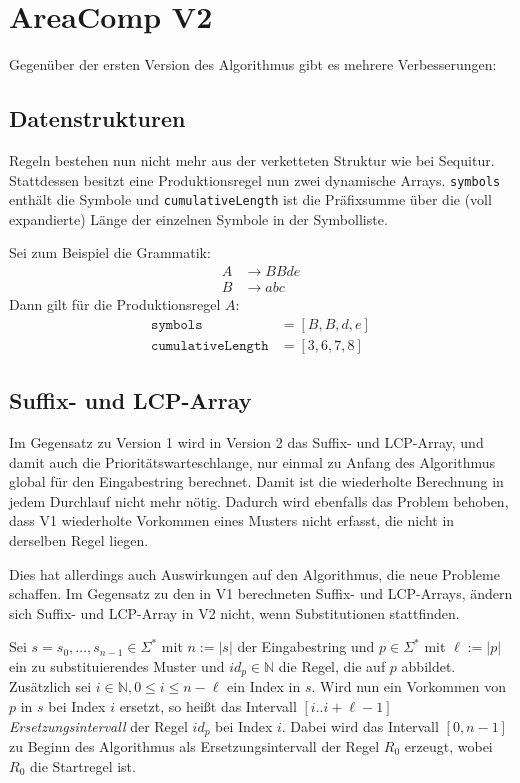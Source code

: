 \section{AreaComp V2}


Gegenüber der ersten Version des Algorithmus gibt es mehrere Verbesserungen:

\subsection{Datenstrukturen} Regeln bestehen nun nicht mehr aus der verketteten Struktur wie bei Sequitur. Stattdessen besitzt eine Produktionsregel nun zwei dynamische Arrays. \texttt{symbols} enthält die Symbole und \texttt{cumulativeLength} ist die Präfixsumme über die (voll expandierte) Länge der einzelnen Symbole in der Symbolliste.

Sei zum Beispiel die Grammatik: 
\begin{align*}
	A &\rightarrow BBde\\
	B &\rightarrow abc
\end{align*}
Dann gilt für die Produktionsregel $A$: 
\begin{align*}
	\texttt{symbols} &= [B, B, d, e]\\
	\texttt{cumulativeLength} &= [3, 6, 7, 8]
\end{align*}

\subsection{Suffix- und LCP-Array}
Im Gegensatz zu Version 1 wird in Version 2 das Suffix- und LCP-Array, und damit auch die Prioritätswarteschlange, nur einmal zu Anfang des Algorithmus global für den Eingabestring berechnet. Damit ist die wiederholte Berechnung in jedem Durchlauf nicht mehr nötig. 
Dadurch wird ebenfalls das Problem behoben, dass V1 wiederholte Vorkommen eines Musters nicht erfasst, die nicht in derselben Regel liegen.

Dies hat allerdings auch Auswirkungen auf den Algorithmus, die neue Probleme schaffen. Im Gegensatz zu den in V1 berechneten Suffix- und LCP-Arrays, ändern sich Suffix- und LCP-Array in V2 nicht, wenn Substitutionen stattfinden. 

Sei $s = s_0, \dots, s_{n-1} \in \Sigma^*$ mit $n := |s|$ der Eingabestring und $p \in \Sigma^*$ mit $\ell := |p|$  ein zu substituierendes Muster und $id_p \in \mathbb{N}$ die Regel, die auf $p$ abbildet. Zusätzlich sei $i \in \mathbb{N}, 0 \leq i \leq n - \ell$ ein Index in $s$. Wird nun ein Vorkommen von $p$ in $s$ bei Index $i$ ersetzt, so heißt das Intervall $[i.. i + \ell - 1]$ \emph{Ersetzungsintervall} der Regel $id_p$ bei Index $i$. Dabei wird das Intervall $[0, n-1]$ zu Beginn des Algorithmus als Ersetzungsintervall der Regel $R_0$ erzeugt, wobei $R_0$ die Startregel ist.

